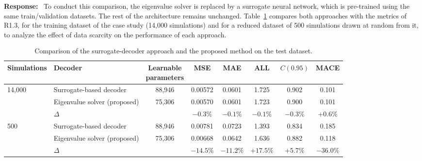 \documentclass[11pt]{article}
\newenvironment{response}{\par\smallskip\noindent\color{resp}\textbf{Response:}\ }{\par}
\begin{document}
\begin{response}
To conduct this comparison, the eigenvalue solver is replaced by a surrogate neural network, which is pre-trained using the same train/validation datasets. 
The rest of the architecture remains unchanged. 
Table~\ref{tab:surrogate} compares both approaches with the metrics of R1.3, for the training dataset of the case study (14,000 simulations) and for a reduced dataset of 500 simulations drawn at random from it, to analyze the effect of data scarcity on the performance of each approach.
	\begin{table}[H]
		\centering\small
		\caption{Comparison of the surrogate-decoder approach and the proposed method on the
			test dataset.}
		\label{tab:surrogate}
		\footnotesize
		\setlength{\tabcolsep}{4pt}
		\begin{tabular}{llcccccc}
			\toprule
			Simulations & Decoder & \shortstack{Learnable\\parameters} & MSE & MAE & ALL & $C(0.95)$ & MACE \\
			\midrule
			14,000 & Surrogate-based decoder          & 88,946 & 0.00572 & 0.0601 & 1.725 & 0.902 & 0.101 \\
			       & Eigenvalue solver (proposed) & 75,306 & 0.00570 & 0.0601 & 1.723 & 0.900 & 0.101 \\
			       & $\Delta$                     &        & $-0.3\%$ & $-0.1\%$ & $-0.1\%$ & $-0.3\%$ & $+0.6\%$ \\
			\midrule
			500    & Surrogate-based decoder          & 88,946 & 0.00781 & 0.0723 & 1.393 & 0.834 & 0.185 \\
			       & Eigenvalue solver (proposed) & 75,306 & 0.00668 & 0.0642 & 1.636 & 0.882 & 0.118 \\
			       & $\Delta$                     &        & $\mathbf{-14.5\%}$ & $\mathbf{-11.2\%}$ & $\mathbf{+17.5\%}$ & $\mathbf{+5.7\%}$ & $\mathbf{-36.0\%}$ \\
			\bottomrule
		\end{tabular}
	\end{table}
	

\end{response}
\end{document}
